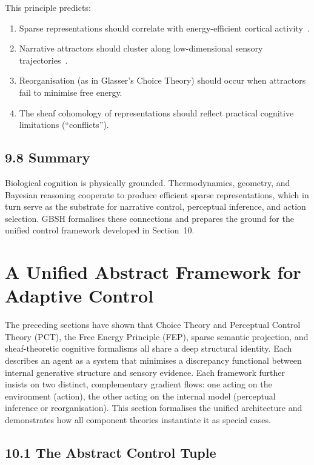 \documentclass[11pt,a4paper,twoside]{article}
\begin{document}
This principle predicts:
\begin{enumerate}
\item Sparse representations should correlate with energy-efficient cortical activity~\cite{sengupta2016}.
\item Narrative attractors should cluster along low-dimensional sensory trajectories~\cite{veldman2021narrative}.
\item Reorganisation (as in Glasser’s Choice Theory) should occur when attractors fail to minimise free energy.
\item The sheaf cohomology of representations should reflect practical cognitive limitations (``conflicts'').
\end{enumerate}

\subsection{9.8 Summary}

Biological cognition is physically grounded. Thermodynamics, geometry, and Bayesian reasoning cooperate to produce efficient sparse representations, which in turn serve as the substrate for narrative control, perceptual inference, and action selection. GBSH formalises these connections and prepares the ground for the unified control framework developed in Section~10.

\section{A Unified Abstract Framework for Adaptive Control}\label{sec:unified}

The preceding sections have shown that Choice Theory and Perceptual Control Theory (PCT), the Free Energy Principle (FEP), sparse semantic projection, and sheaf-theoretic cognitive formalisms all share a deep structural identity. Each describes an agent as a system that minimises a discrepancy functional between internal generative structure and sensory evidence. Each framework further insists on two distinct, complementary gradient flows: one acting on the environment (action), the other acting on the internal model (perceptual inference or reorganisation). This section formalises the unified architecture and demonstrates how all component theories instantiate it as special cases.

\subsection{10.1 The Abstract Control Tuple}
\end{document}
